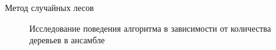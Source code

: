 \documentclass[12pt]{article}
\begin{document}
\begin{section}{Метод случайных лесов}
\begin{figure}[h]
\begin{minipage}[h]{0.5\linewidth}
\end{minipage}
\hfill
\begin{minipage}[h]{0.5\linewidth}
\end{minipage}
\caption{Исследование поведения алгоритма в зависимости от количества деревьев в ансамбле}
\label{ris:image1}
\end{figure} 


\end{section}
\end{document}
